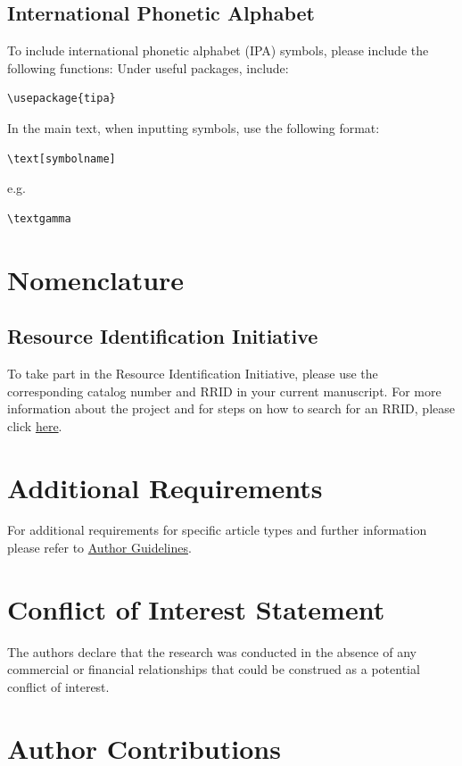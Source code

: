 \documentclass[utf8]{FrontiersinVancouver}
\begin{document}
\subsection{International Phonetic Alphabet}
To include international phonetic alphabet (IPA) symbols, please include the following functions:
Under useful packages, include:\begin{verbatim}\usepackage{tipa}\end{verbatim} 
In the main text, when inputting symbols, use the following format:\begin{verbatim}\text[symbolname]\end{verbatim}e.g.\begin{verbatim}\textgamma\end{verbatim}

\section{Nomenclature}

\subsection{Resource Identification Initiative}
To take part in the Resource Identification Initiative, please use the corresponding catalog number and RRID in your current manuscript. For more information about the project and for steps on how to search for an RRID, please click \href{http://www.frontiersin.org/files/pdf/letter_to_author.pdf}{here}.



\section{Additional Requirements}

For additional requirements for specific article types and further information please refer to \href{http://www.frontiersin.org/about/AuthorGuidelines#AdditionalRequirements}{Author Guidelines}.

\section*{Conflict of Interest Statement}
The authors declare that the research was conducted in the absence of any commercial or financial relationships that could be construed as a potential conflict of interest.

\section*{Author Contributions}
\end{document}

